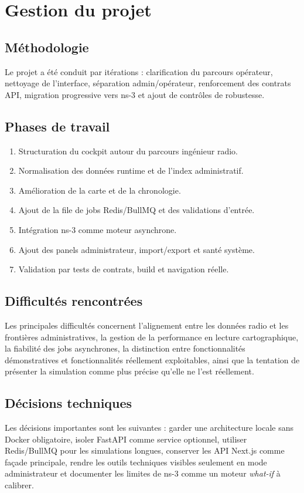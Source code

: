\documentclass[12pt,a4paper,oneside]{report}
\begin{document}
\chapter{Gestion du projet}
\section{Méthodologie}
Le projet a été conduit par itérations : clarification du parcours opérateur, nettoyage de l'interface, séparation admin/opérateur, renforcement des contrats API, migration progressive vers ns-3 et ajout de contrôles de robustesse.

\section{Phases de travail}
\begin{enumerate}[label=\arabic*.]
    \item Structuration du cockpit autour du parcours ingénieur radio.
    \item Normalisation des données runtime et de l'index administratif.
    \item Amélioration de la carte et de la chronologie.
    \item Ajout de la file de jobs Redis/BullMQ et des validations d'entrée.
    \item Intégration ns-3 comme moteur asynchrone.
    \item Ajout des panels administrateur, import/export et santé système.
    \item Validation par tests de contrats, build et navigation réelle.
\end{enumerate}

\section{Difficultés rencontrées}
Les principales difficultés concernent l'alignement entre les données radio et les frontières administratives, la gestion de la performance en lecture cartographique, la fiabilité des jobs asynchrones, la distinction entre fonctionnalités démonstratives et fonctionnalités réellement exploitables, ainsi que la tentation de présenter la simulation comme plus précise qu'elle ne l'est réellement.

\section{Décisions techniques}
Les décisions importantes sont les suivantes : garder une architecture locale sans Docker obligatoire, isoler FastAPI comme service optionnel, utiliser Redis/BullMQ pour les simulations longues, conserver les API Next.js comme façade principale, rendre les outils techniques visibles seulement en mode administrateur et documenter les limites de ns-3 comme un moteur \emph{what-if} à calibrer.
\end{document}
